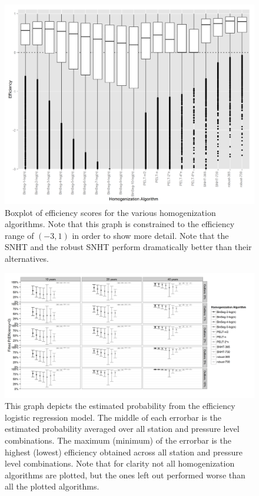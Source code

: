 \documentclass[12pt]{article}
\begin{document}
\begin{figure}[h!]
	\centering
	\includegraphics[width=\textwidth]{homogenization_efficiency_boxplots}
	\caption{Boxplot of efficiency scores for the various homogenization algorithms.  Note that this graph is constrained to the efficiency range of $(-3,1)$ in order to show more detail.  Note that the SNHT and the robust SNHT perform dramatically better than their alternatives.}
	\label{fig:homEfficiency}
\end{figure}

\begin{figure}[h!]
	\centering
	\includegraphics[width=\textwidth]{Efficiency_Model_Plot_BW}
	\caption{This graph depicts the estimated probability from the efficiency logistic regression model.  The middle of each errorbar is the estimated probability averaged over all station and pressure level combinations.  The maximum (minimum) of the errorbar is the highest (lowest) efficiency obtained across all station and pressure level combinations.  Note that for clarity not all homogenization algorithms are plotted, but the ones left out performed worse than all the plotted algorithms.}
	\label{fig:homFitEff}
\end{figure}
\end{document}
